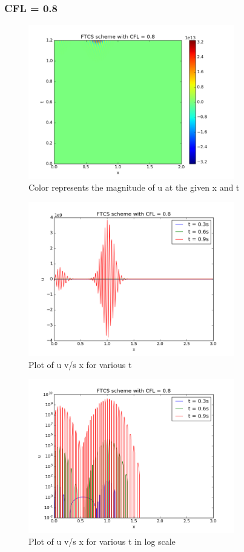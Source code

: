 \documentclass[11pt, a4paper]{article}
\begin{document}
\subsubsection{CFL = 0.8}
\begin{figure}[H]
 \centering
 \includegraphics[width = 0.8\textwidth]{FTCS2_08.png}
 \caption{Color represents the magnitude of u at the given x and t}
\end{figure}

\begin{figure}[H]
 \centering
 \includegraphics[width = 0.8\textwidth]{FTCS2_08_1.png}
 \caption{Plot of u v/s x for various t}
\end{figure}

\begin{figure}[H]
 \centering
 \includegraphics[width = 0.8\textwidth]{FTCS2_08_1_log.png}
 \caption{Plot of u v/s x for various t in log scale}
\end{figure}
\end{document}
